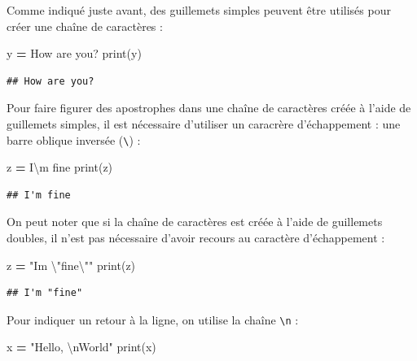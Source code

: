\documentclass[
  12pt,
]{book}
\newenvironment{Shaded}{\begin{snugshade}}{\end{snugshade}}
\newcommand{\BuiltInTok}[1]{#1}
\newcommand{\CharTok}[1]{\textcolor[rgb]{0.31,0.60,0.02}{#1}}
\newcommand{\NormalTok}[1]{#1}
\newcommand{\OperatorTok}[1]{\textcolor[rgb]{0.81,0.36,0.00}{\textbf{#1}}}
\newcommand{\StringTok}[1]{\textcolor[rgb]{0.31,0.60,0.02}{#1}}
\numberwithin{equation}{section}
\numberwithin{countremarque}{section}
\begin{document}
Comme indiqué juste avant, des guillemets simples peuvent être utilisés pour créer une chaîne de caractères :

\begin{Shaded}
\begin{Highlighting}[]
\NormalTok{y }\OperatorTok{=} \StringTok{\textquotesingle{}How are you?\textquotesingle{}}
\BuiltInTok{print}\NormalTok{(y)}
\end{Highlighting}
\end{Shaded}

\begin{lstlisting}
## How are you?
\end{lstlisting}

Pour faire figurer des apostrophes dans une chaîne de caractères créée à l'aide de guillemets simples, il est nécessaire d'utiliser un caracrère d'échappement : une barre oblique inversée (\texttt{\textbackslash{}}) :

\begin{Shaded}
\begin{Highlighting}[]
\NormalTok{z }\OperatorTok{=} \StringTok{\textquotesingle{}I}\CharTok{\textbackslash{}\textquotesingle{}}\StringTok{m fine\textquotesingle{}}
\BuiltInTok{print}\NormalTok{(z)}
\end{Highlighting}
\end{Shaded}

\begin{lstlisting}
## I'm fine
\end{lstlisting}

On peut noter que si la chaîne de caractères est créée à l'aide de guillemets doubles, il n'est pas nécessaire d'avoir recours au caractère d'échappement :

\begin{Shaded}
\begin{Highlighting}[]
\NormalTok{z }\OperatorTok{=} \StringTok{"I\textquotesingle{}m }\CharTok{\textbackslash{}"}\StringTok{fine}\CharTok{\textbackslash{}"}\StringTok{"}
\BuiltInTok{print}\NormalTok{(z)}
\end{Highlighting}
\end{Shaded}

\begin{lstlisting}
## I'm "fine"
\end{lstlisting}

Pour indiquer un retour à la ligne, on utilise la chaîne \texttt{\textbackslash{}n} :

\begin{Shaded}
\begin{Highlighting}[]
\NormalTok{x }\OperatorTok{=} \StringTok{"Hello, }\CharTok{\textbackslash{}n}\StringTok{World"}
\BuiltInTok{print}\NormalTok{(x)}
\end{Highlighting}
\end{Shaded}
\end{document}
